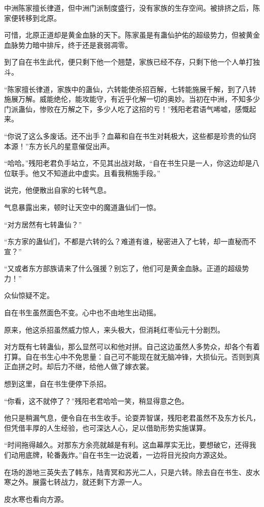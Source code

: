 \begin{this_body}
中洲陈家擅长律道，但中洲门派制度盛行，没有家族的生存空间。被排挤之后，陈家便转移到北原。

可惜，北原正道却是黄金血脉的天下。陈家虽是有蛊仙护佑的超级势力，但被黄金血脉势力暗中排斥，终于还是衰弱凋零。

到了自在书生此代，便只剩下他一个翘楚，家族已经不存，只剩下他一个人单打独斗。

“陈家擅长律道，家族中的蛊仙，六转能使杀招百解，七转能施展千解，到了八转施展万解。威能绝伦，能攻能守，有近乎化解一切的奥妙。当初在中洲，不知多少门派蛊仙，惨败在万解之下，多少人吃了这招的亏！”残阳老君语气唏嘘，感慨起来。

“你说了这么多废话。还不出手？血幕和自在书生对耗极大，这些都是珍贵的仙窍本源！”东方长凡的星意催促出声。

“哈哈。”残阳老君负手站立，不见其出战对敌，“自在书生只是一人，你这边却是八位联手。他又不知道此中虚实。且看我稍施手段。”

说完，他便散出自家的七转气息。

气息暴露出来，顿时让天空中的魔道蛊仙们一惊。

“对方居然有七转蛊仙？”

“东方家的蛊仙们，不都是六转的么？难道有谁，秘密进入了七转，却一直秘而不宣？”

“又或者东方部族请来了什么强援？别忘了，他们可是黄金血脉。正道的超级势力！”

众仙惊疑不定。

自在书生虽然面色不变。心中也不由地生出动摇。

原来，他这杀招虽然威力惊人，来头极大，但消耗红枣仙元十分剧烈。

对方既有七转蛊仙，那么显然可以和他对拼。自己这边虽然人多势众，却各个有着打算。自在书生心中不免思量：自己可不能现在就无脑冲锋，大损仙元。否则到真正血拼之时。却后力不继，给他人做了嫁衣裳。

想到这里，自在书生便停下杀招。

“你看，这不就停了？”残阳老君哈哈一笑，稍显得意之色。

他只是稍漏气息，便令自在书生收手。论耍弄智谋，残阳老君虽然不及东方长凡，但凭借丰厚的人生经验，也可深达人心，足以借助形势实施谋算。

“时间拖得越久。对那东方余亮就越是有利。这血幕厚实无比，要想破它，还得我们动用底牌，轮番轰炸。”自在书生一边说着，一边将目光投向方源这处。

在场的游地三英失去了韩东，陆青冥和苏光二人，只是六转。除去自在书生、皮水寒之外。展露七转战力，就还剩下方源一人。

皮水寒也看向方源。


\end{this_body}
